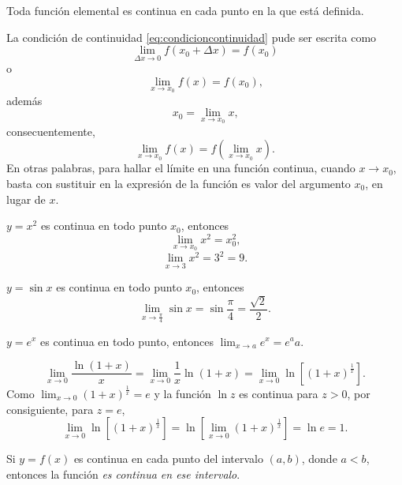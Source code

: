 \begin{theorem}
  Toda función elemental es continua en cada punto en la que está definida.
\end{theorem}


La condición de continuidad \ref{eq:condicioncontinuidad} pude ser escrita como
\[ \lim_{\Delta x \to 0} f(x_0 + \Delta x) = f(x_0) \]
o
\[ \lim_{x \to x_0} f(x) = f(x_0) \text{,} \]
además
\[ x_0 = \lim_{x \to x_0} x \text{,} \]
consecuentemente,
\[ \lim_{x \to x_0} f(x) = f \left( \lim_{x \to x_0} x \right) \text{.} \]
En otras palabras, para hallar el límite en una función continua, cuando \( x \to x_0 \), basta con sustituir en la expresión de la función es valor del argumento \( x_0 \), en lugar de \( x \).


\begin{example}
  \( y = x^2 \) es continua en todo punto \( x_0 \), entonces
  \[ \lim_{x \to x_0} x^2 = x_0^2 \text{,} \]
  \[ \lim_{x \to 3} x^2 = 3^2 = 9\text{.} \]
\end{example}


\begin{example}
  \( y = \sin x \) es continua en todo punto \( x_0 \), entonces
  \[
  \lim_{x \to \frac{\pi}{4}} \sin x = \sin \frac{\pi}{4} = \frac {\sqrt{2}} {2}
  \text{.}
  \]
\end{example}


\begin{example}
  \( y = e^x \) es continua en todo punto, entonces \( \lim_{x \to a} e^x = e^aa \).
\end{example}


\begin{example} \label{ej:ln1yxlx}
  \[
  \lim_{x \to 0} \frac {\ln \left( 1 + x \right)} {x}
  = \lim_{x \to 0} \frac{1}{x} \ln \left( 1 + x \right)
  = \lim_{x \to 0} \ln \left[ \left( 1 + x \right) ^{\frac{1}{x}} \right]
  \text{.}
  \]
  Como \( \lim_{x \to 0} \left( 1 + x \right) ^{\frac{1}{x}} = e \) y la función \( \ln z \) es continua para \( z > 0 \), por consiguiente, para \( z = e \),
  \[
  \lim_{x \to 0} \ln \left[ \left( 1 + x \right) ^{\frac{1}{x}} \right]
  = \ln \left[ \lim_{x \to 0} \left( 1 + x \right) ^{\frac{1}{x}} \right]
  = \ln e = 1 \text{.}
  \]
\end{example}


\begin{definition}
  Si \( y = f(x) \) es continua en cada punto del intervalo \( (a, b) \), donde \( a < b \), entonces la función \emph{es continua en ese intervalo}.
\end{definition}


